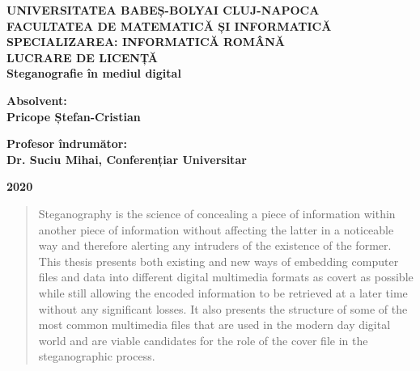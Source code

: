 \documentclass[notitlepage]{report}
\begin{document}
\begin{center}
        \vspace*{1cm}
        
        \LARGE
        \textbf{UNIVERSITATEA BABEȘ-BOLYAI CLUJ-NAPOCA \\ FACULTATEA DE MATEMATICĂ ȘI INFORMATICĂ \\ SPECIALIZAREA: INFORMATICĂ ROMÂNĂ}
        \vspace{1cm}\\

        \vfill
        \LARGE
        \textbf{LUCRARE DE LICENȚĂ} \\
	  \Large
	  \textbf{Steganografie în mediul digital}
        \vspace{1cm}

        
        \vfill
        
        \textbf{Absolvent:\\ Pricope Ștefan-Cristian}
        \vspace{0.1cm}

        \textbf{Profesor îndrumător:\\ Dr. Suciu Mihai, Conferențiar Universitar}\\
        \vspace{1cm}        

	  \Large
	  \textbf{2020}
        \vspace{0.3cm}
\end{center}


\clearpage
\begin{abstract}
Steganography is the science of concealing a piece of information within another piece of information without affecting the latter in a noticeable way and therefore alerting any intruders of the existence of the former. 
This thesis presents both existing and new ways of embedding computer files and data into different digital multimedia formats as covert as possible while still allowing the encoded information to be retrieved at a later time without any significant losses. It also       presents the structure of some of the most common multimedia files that are used in the modern day digital world and are viable candidates for the role of the cover file in the steganographic process.
\end{abstract}


\tableofcontents{}






\end{document}
